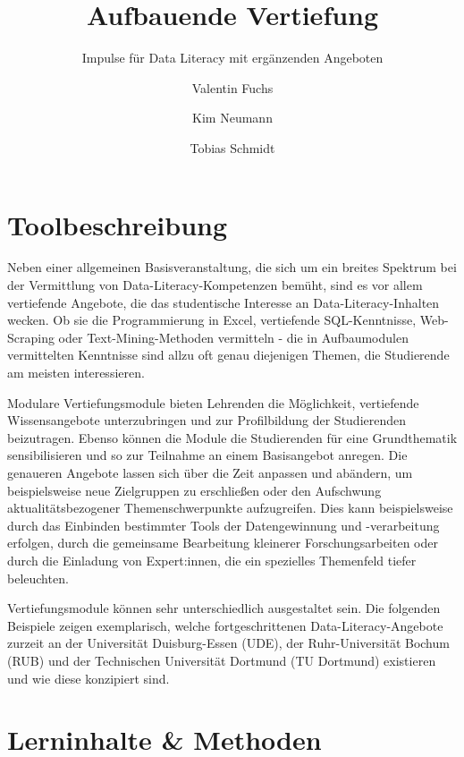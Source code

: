 \documentclass[
  letterpaper,
  DIV=11]{scrartcl}
\title{Aufbauende Vertiefung}
\subtitle{Impulse für Data Literacy mit ergänzenden Angeboten}
\author{Valentin Fuchs \and Kim Neumann \and Tobias Schmidt}
\date{}
\renewcommand*\contentsname{Inhaltsverzeichnis}
\newcommand\contentsname{Inhaltsverzeichnis}
\begin{document}
\maketitle
\ifdefined\Shaded\renewenvironment{Shaded}{\begin{tcolorbox}[enhanced, breakable, borderline west={3pt}{0pt}{shadecolor}, interior hidden, sharp corners, boxrule=0pt, frame hidden]}{\end{tcolorbox}}\fi

\renewcommand*\contentsname{Inhalt}
{
\hypersetup{linkcolor=}
\setcounter{tocdepth}{1}
\tableofcontents
}
\hypertarget{toolbeschreibung}{%
\section{Toolbeschreibung}\label{toolbeschreibung}}

Neben einer allgemeinen Basisveranstaltung, die sich um ein breites
Spektrum bei der Vermittlung von Data-Literacy-Kompetenzen bemüht, sind
es vor allem vertiefende Angebote, die das studentische Interesse an
Data-Literacy-Inhalten wecken. Ob sie die Programmierung in Excel,
vertiefende SQL-Kenntnisse, Web-Scraping oder Text-Mining-Methoden
vermitteln - die in Aufbaumodulen vermittelten Kenntnisse sind allzu oft
genau diejenigen Themen, die Studierende am meisten interessieren.

Modulare Vertiefungsmodule bieten Lehrenden die Möglichkeit, vertiefende
Wissensangebote unterzubringen und zur Profilbildung der Studierenden
beizutragen. Ebenso können die Module die Studierenden für eine
Grundthematik sensibilisieren und so zur Teilnahme an einem Basisangebot
anregen. Die genaueren Angebote lassen sich über die Zeit anpassen und
abändern, um beispielsweise neue Zielgruppen zu erschließen oder den
Aufschwung aktualitätsbezogener Themenschwerpunkte aufzugreifen. Dies
kann beispielsweise durch das Einbinden bestimmter Tools der
Datengewinnung und -verarbeitung erfolgen, durch die gemeinsame
Bearbeitung kleinerer Forschungsarbeiten oder durch die Einladung von
Expert:innen, die ein spezielles Themenfeld tiefer beleuchten.

Vertiefungsmodule können sehr unterschiedlich ausgestaltet sein. Die
folgenden Beispiele zeigen exemplarisch, welche fortgeschrittenen
Data-Literacy-Angebote zurzeit an der Universität Duisburg-Essen (UDE),
der Ruhr-Universität Bochum (RUB) und der Technischen Universität
Dortmund (TU Dortmund) existieren und wie diese konzipiert sind.

\hypertarget{lerninhalte-methoden}{%
\section{Lerninhalte \& Methoden}\label{lerninhalte-methoden}}
\end{document}
